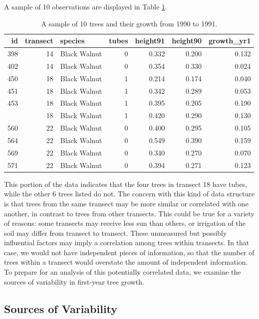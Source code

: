 \documentclass[
]{krantz}
\begin{document}
A sample of 10 observations are displayed in Table \ref{tab:treeTubeTab}.

\begin{table}

\caption{\label{tab:treeTubeTab}A sample of 10 trees and their growth from 1990 to 1991.}
\centering
\begin{tabular}[t]{rrlrrrr}
\toprule
id & transect & species & tubes & height91 & height90 & growth\_yr1\\
\midrule
398 & 14 & Black Walnut & 0 & 0.332 & 0.200 & 0.132\\
402 & 14 & Black Walnut & 0 & 0.354 & 0.330 & 0.024\\
450 & 18 & Black Walnut & 1 & 0.214 & 0.174 & 0.040\\
451 & 18 & Black Walnut & 1 & 0.342 & 0.289 & 0.053\\
453 & 18 & Black Walnut & 1 & 0.395 & 0.205 & 0.190\\
\addlinespace
458 & 18 & Black Walnut & 1 & 0.420 & 0.290 & 0.130\\
560 & 22 & Black Walnut & 0 & 0.400 & 0.295 & 0.105\\
564 & 22 & Black Walnut & 0 & 0.549 & 0.390 & 0.159\\
569 & 22 & Black Walnut & 0 & 0.340 & 0.270 & 0.070\\
571 & 22 & Black Walnut & 0 & 0.394 & 0.271 & 0.123\\
\bottomrule
\end{tabular}
\end{table}

This portion of the data indicates that the four trees in transect 18 have tubes, while the other 6 trees listed do not. The concern with this kind of data structure is that trees from the same transect may be more similar or correlated with one another, in contrast to trees from other transects. This could be true for a variety of reasons: some transects may receive less sun than others, or irrigation of the soil may differ from transect to transect. These unmeasured but possibly influential factors may imply a correlation among trees within transects. In that case, we would not have independent pieces of information, so that the number of trees within a transect would overstate the amount of independent information. To prepare for an analysis of this potentially correlated data, we examine the sources of variability in first-year tree growth.

\hypertarget{sources-of-variability-1}{%
\subsection{Sources of Variability}\label{sources-of-variability-1}}
\end{document}
